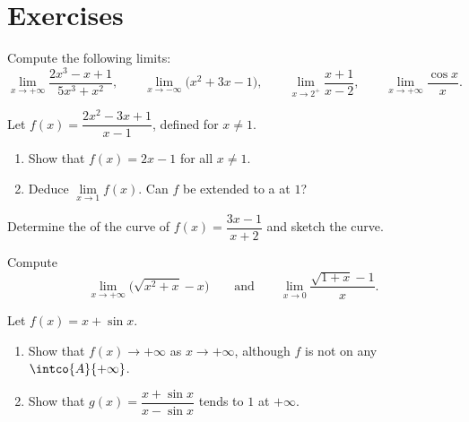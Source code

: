 \section{Exercises}

\begin{exercise}[$\star$]\label{exo:g12:limcont:1}
Compute the following limits:
\[
\lim_{x\to+\infty} \frac{2x^3 - x + 1}{5x^3 + x^2}, \qquad
\lim_{x\to-\infty} \bigl(x^2 + 3x - 1\bigr), \qquad
\lim_{x\to 2^+} \frac{x+1}{x-2}, \qquad
\lim_{x\to+\infty} \frac{\cos x}{x}.
\]
\end{exercise}

\begin{exercise}[$\star$]\label{exo:g12:limcont:2}
Let $f(x) = \dfrac{2x^2 - 3x + 1}{x - 1}$, defined for $x \neq 1$.
\begin{enumerate}
  \item Show that $f(x) = 2x - 1$ for all $x \neq 1$.
  \item Deduce $\lim\limits_{x \to 1} f(x)$. Can $f$ be extended to a
          at $1$?
\end{enumerate}
\end{exercise}

\begin{exercise}[$\star$]\label{exo:g12:limcont:3}
Determine the  of the curve of
$f(x) = \dfrac{3x - 1}{x + 2}$ and sketch the curve.
\end{exercise}

\begin{exercise}[$\star\star$]\label{exo:g12:limcont:4}
Compute
\[
\lim_{x\to+\infty} \bigl(\sqrt{x^2 + x} - x\bigr)
\qquad\text{and}\qquad
\lim_{x\to 0} \frac{\sqrt{1+x} - 1}{x}.
\]
\end{exercise}

\begin{exercise}[$\star\star$]\label{exo:g12:limcont:5}
Let $f(x) = x + \sin x$.
\begin{enumerate}
  \item Show that $f(x) \to +\infty$ as $x \to +\infty$, although $f$ is not
         on any  $\intco{A}{+\infty}$.
  \item Show that $g(x) = \dfrac{x + \sin x}{x - \sin x}$ tends to $1$ at
        $+\infty$.
\end{enumerate}
\end{exercise}

